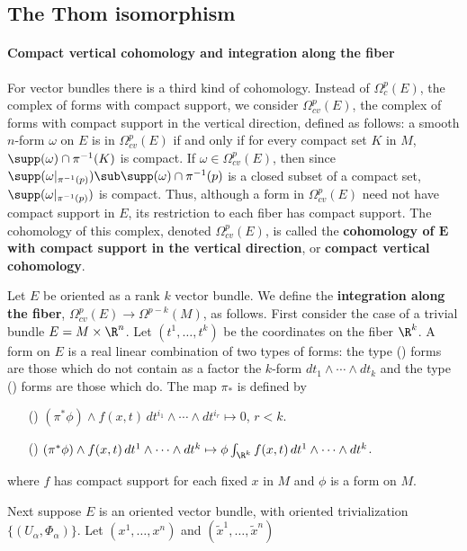 \subsection{The Thom isomorphism}
\paragraph{Compact vertical cohomology and integration along the fiber}
For vector bundles there is a third kind of cohomology. Instead of $\Omega^p_c(E)$, the complex of forms with compact support, we consider $\Omega_{cv}^p(E)$, the 
complex of forms with compact support in the vertical direction, defined as follows: a smooth $n$-form $\omega$ on $E$ is in $\Omega^p_{cv}(E)$ if and only if for 
every compact set $K$ in $M$, $\supp(\omega)\cap\pi^{-1}(K)$ is compact. If $\omega\in\Omega^p_{cv}(E)$, then since $\supp(\omega|_{\pi^{-1}(p)})\sub\supp(\omega)\cap\pi^{-1}(p)$ 
is a  closed subset of a compact set, $\supp(\omega|_{\pi^{-1}(p)})$ is compact. Thus, although a form in $\Omega^p_{cv}(E)$ need not have compact support in $E$, its 
restriction to each fiber has compact support. The cohomology of this complex, denoted $\Omega^p_{cv}(E)$, is called the \textbf{cohomology of $\bm{E}$ with compact 
support in the vertical direction}, or \textbf{compact vertical cohomology}.\par
Let $E$ be oriented as a rank $k$ vector bundle. We define the \textbf{integration along the fiber}, $\Omega^p_{cv}(E)\to\Omega^{p-k}(M)$, as follows. First consider 
the case of a trivial bundle $E=M\times\R^n$. Let $(t^1,\dots,t^k)$ be the coordinates on the fiber $\R^k$. A form on $E$ is a real linear combination of two types of 
forms: the type () forms are those which do not contain as a factor the $k$-form $dt_1\wedge\cdots\wedge dt_k$ and the type () forms are those which 
do. The map $\pi_*$ is defined by
\begin{itemize}
\item[(\rmnum{1})] $(\pi^*\phi)\wedge f(x,t)\,dt^{i_1}\wedge\cdots\wedge dt^{i_r}\mapsto 0$, $r<k$.
\item[(\rmnum{2})] $(\pi^*\phi)\wedge f(x,t)\,dt^{1}\wedge\cdots\wedge dt^{k}\mapsto \phi\int_{\R^k}f(x,t)\,dt^1\wedge\cdots\wedge dt^k$.
\end{itemize}
where $f$ has compact support for each fixed $x$ in $M$ and $\phi$ is a form on $M$.\par
Next suppose $E$ is an oriented vector bundle, with oriented trivialization $\{(U_\alpha,\varPhi_\alpha)\}$. Let $(x^1,\dots,x^n)$ and $(\widetilde{x}^1,\dots,\widetilde{x}^n)$ 
